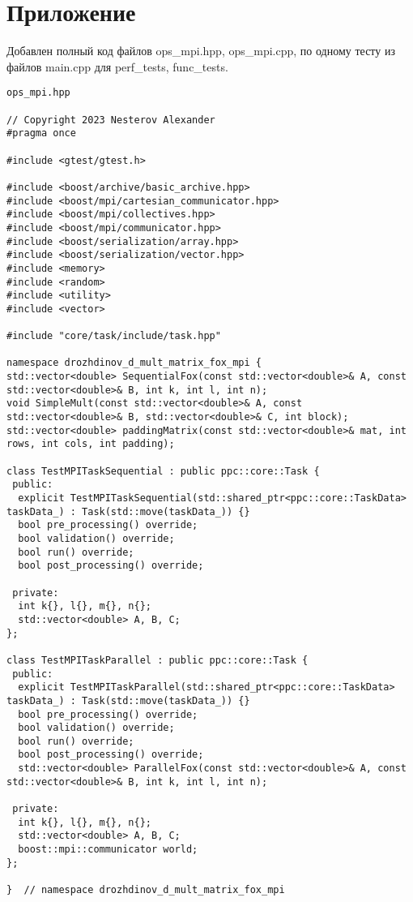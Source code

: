 \documentclass{report}
\begin{document}
\section*{Приложение}
Добавлен полный код файлов ops\_mpi.hpp, ops\_mpi.cpp, по одному тесту из файлов main.cpp для perf\_tests, func\_tests.
\begin{lstlisting}
ops_mpi.hpp

// Copyright 2023 Nesterov Alexander
#pragma once

#include <gtest/gtest.h>

#include <boost/archive/basic_archive.hpp>
#include <boost/mpi/cartesian_communicator.hpp>
#include <boost/mpi/collectives.hpp>
#include <boost/mpi/communicator.hpp>
#include <boost/serialization/array.hpp>
#include <boost/serialization/vector.hpp>
#include <memory>
#include <random>
#include <utility>
#include <vector>

#include "core/task/include/task.hpp"

namespace drozhdinov_d_mult_matrix_fox_mpi {
std::vector<double> SequentialFox(const std::vector<double>& A, const std::vector<double>& B, int k, int l, int n);
void SimpleMult(const std::vector<double>& A, const std::vector<double>& B, std::vector<double>& C, int block);
std::vector<double> paddingMatrix(const std::vector<double>& mat, int rows, int cols, int padding);

class TestMPITaskSequential : public ppc::core::Task {
 public:
  explicit TestMPITaskSequential(std::shared_ptr<ppc::core::TaskData> taskData_) : Task(std::move(taskData_)) {}
  bool pre_processing() override;
  bool validation() override;
  bool run() override;
  bool post_processing() override;

 private:
  int k{}, l{}, m{}, n{};
  std::vector<double> A, B, C;
};

class TestMPITaskParallel : public ppc::core::Task {
 public:
  explicit TestMPITaskParallel(std::shared_ptr<ppc::core::TaskData> taskData_) : Task(std::move(taskData_)) {}
  bool pre_processing() override;
  bool validation() override;
  bool run() override;
  bool post_processing() override;
  std::vector<double> ParallelFox(const std::vector<double>& A, const std::vector<double>& B, int k, int l, int n);

 private:
  int k{}, l{}, m{}, n{};
  std::vector<double> A, B, C;
  boost::mpi::communicator world;
};

}  // namespace drozhdinov_d_mult_matrix_fox_mpi

\end{lstlisting}
\end{document}
